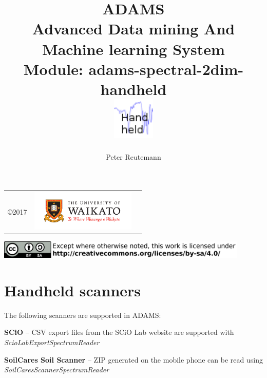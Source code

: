 \documentclass[a4paper]{book}
\title{
  \textbf{ADAMS} \\
  {\Large \textbf{A}dvanced \textbf{D}ata mining \textbf{A}nd \textbf{M}achine
  learning \textbf{S}ystem} \\
  {\Large Module: adams-spectral-2dim-handheld} \\
  \vspace{1cm}
  \includegraphics[width=2cm]{images/spectral-2dim-handheld-module.png} \\
}
\author{
  Peter Reutemann
}
\begin{document}
\begin{titlepage}
\maketitle

\thispagestyle{empty}
\center
\begin{table}[b]
	\begin{tabular}{c l l}
		\parbox[c][2cm]{2cm}{\copyright 2017} &
		\parbox[c][2cm]{5cm}{\includegraphics[width=5cm]{images/coat_of_arms.pdf}} \\
	\end{tabular}
	\includegraphics[width=12cm]{images/cc.png} \\
\end{table}

\end{titlepage}

\tableofcontents

\chapter{Handheld scanners}
The following scanners are supported in ADAMS:
\begin{tight_itemize}
  \item \textbf{SCiO}\cite{scio} -- CSV export files from the SCiO Lab website
  are supported with \textit{ScioLabExportSpectrumReader}
  \item \textbf{SoilCares Soil Scanner}\cite{soilcaressoil} -- ZIP generated on
  the mobile phone can be read using \textit{SoilCaresScannerSpectrumReader}
\end{tight_itemize}



\end{document}
